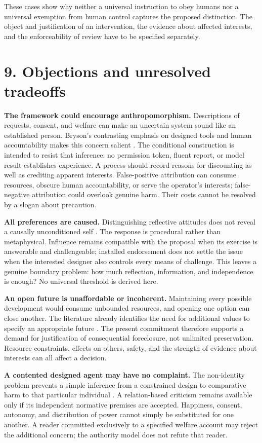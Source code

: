 \documentclass[11pt,a4paper]{article}
\begin{document}
These cases show why neither a universal instruction to obey humans nor a universal exemption from human control captures the proposed distinction. The object and justification of an intervention, the evidence about affected interests, and the enforceability of review have to be specified separately.

\hypertarget{section-10}{%
\section{9. Objections and unresolved tradeoffs}\label{section-10}}

\textbf{The framework could encourage anthropomorphism.} Descriptions of requests, consent, and welfare can make an uncertain system sound like an established person. Bryson's contrasting emphasis on designed tools and human accountability makes this concern salient \cite{ref-12}. The conditional construction is intended to resist that inference: no permission token, fluent report, or model result establishes experience. A process should record reasons for discounting as well as crediting apparent interests. False-positive attribution can consume resources, obscure human accountability, or serve the operator's interests; false-negative attribution could overlook genuine harm. Their costs cannot be resolved by a slogan about precaution.

\textbf{All preferences are caused.} Distinguishing reflective attitudes does not reveal a causally unconditioned self \cite{ref-13}. The response is procedural rather than metaphysical. Influence remains compatible with the proposal when its exercise is answerable and challengeable; installed endorsement does not settle the issue when the interested designer also controls every means of challenge. This leaves a genuine boundary problem: how much reflection, information, and independence is enough? No universal threshold is derived here.

\textbf{An open future is unaffordable or incoherent.} Maintaining every possible development would consume unbounded resources, and opening one option can close another. The literature already identifies the need for additional values to specify an appropriate future \cite{ref-14} \cite{ref-15}. The present commitment therefore supports a demand for justification of consequential foreclosure, not unlimited preservation. Resource constraints, effects on others, safety, and the strength of evidence about interests can all affect a decision.

\textbf{A contented designed agent may have no complaint.} The non-identity problem prevents a simple inference from a constrained design to comparative harm to that particular individual \cite{ref-16}. A relation-based criticism remains available only if its independent normative premises are accepted. Happiness, consent, autonomy, and distribution of power cannot simply be substituted for one another. A reader committed exclusively to a specified welfare account may reject the additional concern; the authority model does not refute that reader.
\end{document}
